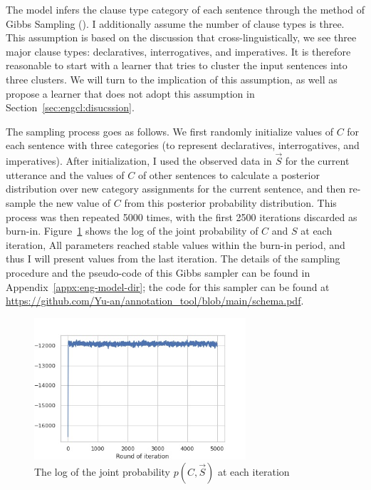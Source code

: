 The model infers the clause type category of each sentence through the method of Gibbs Sampling (\cite{geman1984gibbs}). I additionally assume the number of clause types is three. This assumption is based on the discussion that cross-linguistically, we see three major clause types: declaratives, interrogatives, and imperatives. It is therefore reasonable to start with a learner that tries to cluster the input sentences into three clusters. We will turn to the implication of this assumption, as well as propose a learner that does not adopt this assumption in Section~\ref{sec:engcl:disucssion}. 

The sampling process goes as follows. We first randomly initialize values of $C$ for each sentence with three categories (to represent declaratives, interrogatives, and imperatives). After initialization, I used the observed data in $\vec{S}$ for the current utterance and the values of $C$ of other sentences to calculate a posterior distribution over new category assignments for the current sentence, and then re-sample the new value of $C$ from this posterior probability distribution. This process was then repeated 5000 times, with the first 2500 iterations discarded as burn-in. Figure~\ref{fig:baseline-iter} shows the log of the joint probability of $C$ and $S$ at each iteration,  All parameters reached stable values within the burn-in period, and thus I will present values from the last iteration. The details of the sampling procedure and the pseudo-code of this Gibbs sampler can be found in Appendix~\ref{appx:eng-model-dir}; the code for this sampler can be found at \url{https://github.com/Yu-an/annotation_tool/blob/main/schema.pdf}. 

\begin{figure}[H]
    \centering
    \includegraphics[width=0.7\textwidth]{figures/baseline-iter.jpg}
    \caption{The log of the joint probability $p(C,\vec{S})$ at each iteration}
    \label{fig:baseline-iter}
\end{figure}


